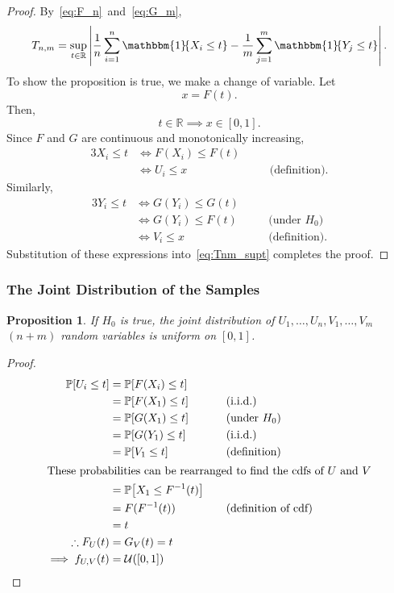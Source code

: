 \documentclass[letterpaper, reqno]{amsart}
\newtheorem{prop}{Proposition}[section]
\numberwithin{equation}{section}
\newcommand{\Prob}[1]{\mathbb{P}\mleft[#1\mright]}
\newcommand{\R}{\mathbb{R}}  %
\newcommand{\U}[2]{\mathcal{U}\mleft(\mleft[ #1, #2 \mright]\mright)}
\newcommand{\indic}[1]{\mathbbm{1}\!\mleft\{#1\mright\}} %
\newcommand{\iid}{i.i.d.}
\newcommand{\sumi}[2]{\sum_{#1=1}^{#2}}
\newcommand{\avg}[2]{\frac{1}{#2}\sumi{#1}{#2}}
\newcommand{\by}[1]{&\quad&\text{(#1)}}
\begin{document}
\begin{proof}
  By~\eqref{eq:F_n}~and~\eqref{eq:G_m},
  \begin{equation} \label{eq:Tnm_supt}
    T_{n,m} = \sup_{t \in \R} \left| \avg{i}{n} \indic{X_i \le t} - \avg{j}{m} \indic{Y_j \le t} \right|.
  \end{equation}
  To show the proposition is true, we make a change of variable. Let
    \[ x = F(t). \]
  Then,
    \[ t \in \R \implies x \in [0, 1]. \]
    Since $F$ and $G$ are continuous and monotonically increasing,
  \begin{alignat*}{3}
    X_i \le t &\iff F(X_i) \le F(t) \\
              &\iff U_i \le x \by{definition}.
  \end{alignat*}
  Similarly,
  \begin{alignat*}{3}
    Y_i \le t &\iff G(Y_i) \le G(t) \\
              &\iff G(Y_i) \le F(t) \by{under $H_0$} \\
              &\iff V_i \le x \by{definition}.
  \end{alignat*}
  Substitution of these expressions into~\eqref{eq:Tnm_supt} completes the
  proof.
\end{proof}

\subsubsection{The Joint Distribution of the Samples}
\begin{prop} \label{prop:Tnm}
  If $H_0$ is true, the joint distribution of $U_1, \dots, U_n, V_1, \dots, V_m$
  $(n+m)$ random variables is uniform on $[0, 1]$.
\end{prop}

\begin{proof}
  \begin{alignat*}{3}
    \Prob{U_i \le t} &= \Prob{F(X_i) \le t} \\
                     &= \Prob{F(X_1) \le t} \by{\iid} \\
                     &= \Prob{G(X_1) \le t} \by{under $H_0$} \\
                     &= \Prob{G(Y_1) \le t} \by{\iid} \\
                     &= \Prob{V_1 \le t} \by{definition} \\
    \intertext{These probabilities can be rearranged to find the cdfs of $U$ and $V$}
                     &= \Prob{X_1 \le F^{-1}(t)} \\
                     &= F(F^{-1}(t)) \by{definition of cdf} \\
                     &= t \\
    \therefore F_U(t) &= G_V(t) = t \\
    \implies f_{U,V}(t) &= \U{0}{1} \tag*{\qedhere}
  \end{alignat*}
\end{proof}
\end{document}
